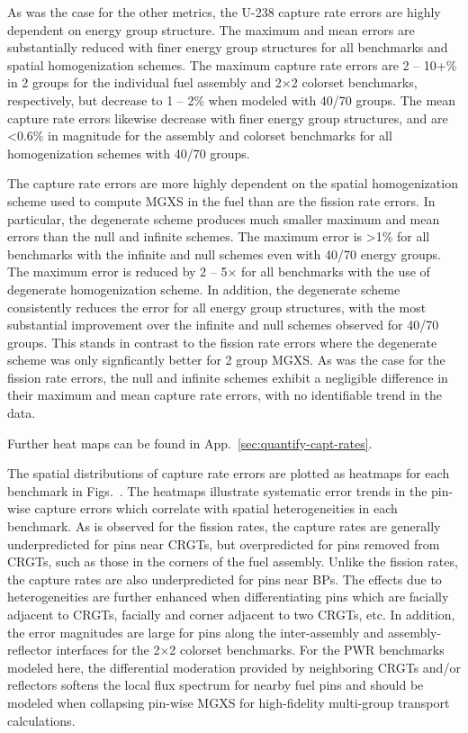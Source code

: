 As was the case for the other metrics, the U-238 capture rate errors are highly dependent on energy group structure. The maximum and mean errors are substantially reduced with finer energy group structures for all benchmarks and spatial homogenization schemes. The maximum capture rate errors are 2 -- 10+\% in 2 groups for the individual fuel assembly and 2$\times$2 colorset benchmarks, respectively, but decrease to 1 -- 2\% when modeled with 40/70 groups. The mean capture rate errors likewise decrease with finer energy group structures, and are <0.6\% in magnitude for the assembly and colorset benchmarks for all homogenization schemes with 40/70 groups.

The capture rate errors are more highly dependent on the spatial homogenization scheme used to compute \ac{MGXS} in the fuel than are the fission rate errors. In particular, the degenerate scheme produces much smaller maximum and mean errors than the null and infinite schemes. The maximum error is >1\% for all benchmarks with the infinite and null schemes even with 40/70 energy groups. The maximum error is reduced by 2 -- 5$\times$ for all benchmarks with the use of degenerate homogenization scheme. In addition, the degenerate scheme consistently reduces the error for all energy group structures, with the most substantial improvement over the infinite and null schemes observed for 40/70 groups. This stands in contrast to the fission rate errors where the degenerate scheme was only signficantly better for 2 group \ac{MGXS}. As was the case for the fission rate errors, the null and infinite schemes exhibit a negligible difference in their maximum and mean capture rate errors, with no identifiable trend in the data.

Further heat maps can be found in App.~\ref{sec:quantify-capt-rates}.

The spatial distributions of capture rate errors are plotted as heatmaps for each benchmark in Figs.~. The heatmaps illustrate systematic error trends in the pin-wise capture errors which correlate with spatial heterogeneities in each benchmark. As is observed for the fission rates, the capture rates are generally underpredicted for pins near \acp{CRGT}, but overpredicted for pins removed from \acp{CRGT}, such as those in the corners of the fuel assembly. Unlike the fission rates, the capture rates are also underpredicted for pins near \acp{BP}. The effects due to heterogeneities are further enhanced when differentiating pins which are facially adjacent to \acp{CRGT}, facially and corner adjacent to two \acp{CRGT}, etc. In addition, the error magnitudes are large for pins along the inter-assembly and assembly-reflector interfaces for the 2$\times$2 colorset benchmarks. For the \ac{PWR} benchmarks modeled here, the differential moderation provided by neighboring \acp{CRGT} and/or reflectors softens the local flux spectrum for nearby fuel pins and should be modeled when collapsing pin-wise \ac{MGXS} for high-fidelity multi-group transport calculations.

